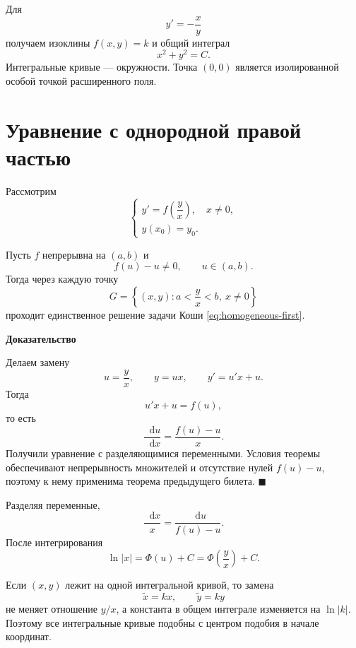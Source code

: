 \documentclass[12pt,a4paper]{article}
\numberwithin{equation}{section}
\newcommand{\dd}{\mathop{}\!\mathrm{d}}
\renewenvironment{proof}[1][Доказательство]{\begin{center}\textbf{#1}\end{center}}{\hfill$\blacksquare$\par}
\DeclareRobustCommand{\examtag}[1]{\space{\normalfont\small\color{HSEgray}(#1)}}
\begin{document}
\begin{exampleHSE}
Для
\[
y'=-\frac{x}{y}
\]
получаем изоклины $f(x,y)=k$ и общий интеграл
\[
x^2+y^2=C.
\]
Интегральные кривые --- окружности. Точка $(0,0)$ является изолированной особой точкой расширенного поля.

\end{exampleHSE}

\section{Уравнение с однородной правой частью\examtag{вопрос~10}}

Рассмотрим
\begin{equation}
\begin{cases}
 y'=f\!\left(\dfrac{y}{x}\right),\quad x\neq0,\\
 y(x_0)=y_0.
\end{cases}
\label{eq:homogeneous-first}
\end{equation}

\begin{theoremHSE}
Пусть $f$ непрерывна на $(a,b)$ и
\[
f(u)-u\neq0,\qquad u\in(a,b).
\]
Тогда через каждую точку
\[
G=\left\{(x,y):a<\frac{y}{x}<b,\ x\neq0\right\}
\]
проходит единственное решение задачи Коши \eqref{eq:homogeneous-first}.
\end{theoremHSE}

\begin{proof}
Делаем замену
\[
u=\frac{y}{x},\qquad y=ux,\qquad y'=u'x+u.
\]
Тогда
\[
u'x+u=f(u),
\]
то есть
\[
\frac{\dd u}{\dd x}=\frac{f(u)-u}{x}.
\]
Получили уравнение с разделяющимися переменными. Условия теоремы обеспечивают непрерывность множителей и отсутствие нулей $f(u)-u$, поэтому к нему применима теорема предыдущего билета.
\end{proof}

Разделяя переменные,
\[
\frac{\dd x}{x}=\frac{\dd u}{f(u)-u}.
\]
После интегрирования
\[
\ln|x|=\Phi(u)+C
=
\Phi\!\left(\frac{y}{x}\right)+C.
\]

\begin{corollaryHSE}
Если $(x,y)$ лежит на одной интегральной кривой, то замена
\[
\widetilde x=kx,\qquad \widetilde y=ky
\]
не меняет отношение $y/x$, а константа в общем интеграле изменяется на $\ln|k|$. Поэтому все интегральные кривые подобны с центром подобия в начале координат.
\end{corollaryHSE}
\end{document}
